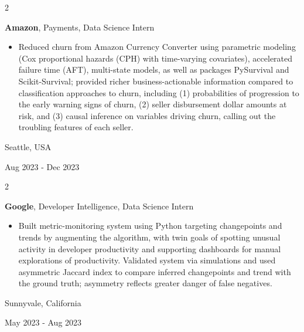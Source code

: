 \documentclass[10pt, letterpaper]{article}
\newenvironment{highlights}{
    \begin{itemize}[
        topsep=0.10 cm,
        parsep=0.10 cm,
        partopsep=0pt,
        itemsep=0pt,
        leftmargin=0.4 cm + 10pt
    ]
}{
    \end{itemize}
} %
\newenvironment{twocolentry}[2][]{
    \onecolentry
    \def\secondColumn{#2}
    \setcolumnwidth{\fill, 4.08 cm}
    \begin{paracol}{2}
}{
    \switchcolumn \raggedleft \secondColumn
    \end{paracol}
    \endonecolentry
} %
\let\hrefWithoutArrow\href
\renewcommand{\href}[2]{\hrefWithoutArrow{#1}{\mbox{\ifthenelse{\equal{#2}{}}{ }{#2 }\raisebox{.15ex}{\footnotesize \faExternalLink*}}}}
\begin{document}
        \begin{twocolentry}{
            Seattle, USA

        Aug 2023 - Dec 2023

        }
        \textbf{Amazon}, Payments, Data Science Intern
            \begin{highlights}
                \item Reduced churn from Amazon Currency Converter using parametric modeling (Cox proportional hazards (CPH) with time-varying covariates), accelerated failure time (AFT), multi-state models, as well as packages PySurvival and Scikit-Survival; provided richer business-actionable information compared to classification approaches to churn, including (1) probabilities of progression to the early warning signs of churn, (2) seller disbursement dollar amounts at risk, and (3) causal inference on variables driving churn, calling out the troubling features of each seller.

            \end{highlights}
        \end{twocolentry}

        \vspace{0.2 cm}

        \begin{twocolentry}{
            Sunnyvale, California

        May 2023 - Aug 2023

        }
            \textbf{Google}, Developer Intelligence, Data Science Intern
            \begin{highlights}
                \item Built metric-monitoring system using Python targeting changepoints and trends by augmenting the \href{https://arxiv.org/pdf/1101.1438}{PELT} algorithm, with twin goals of spotting unusual activity in developer productivity and supporting dashboards for manual explorations of productivity. Validated system via simulations and used asymmetric Jaccard index to compare inferred changepoints and trend with the ground truth; asymmetry reflects greater danger of false negatives.
            \end{highlights}
        \end{twocolentry}

        \vspace{0.2 cm}
\end{document}
